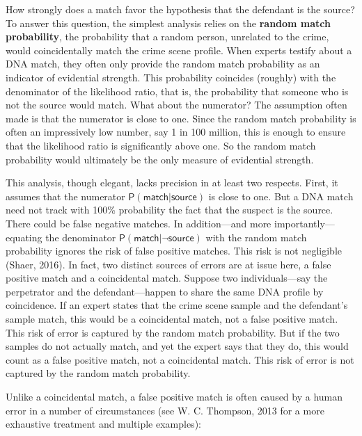 \documentclass[
  10pt,
  dvipsnames,enabledeprecatedfontcommands]{scrartcl}
\newcommand{\raf}[1]{\todo[color=olive!40]{#1}}
\newcommand{\pr}[1]{\mathsf{P}(#1)}
\begin{document}
\noindent How strongly does a match favor the hypothesis that the
defendant is the source? To answer this question, the simplest analysis
relies on the \textbf{random match probability}, the probability that a
random person, unrelated to the crime, would coincidentally match the
crime scene profile. When experts testify about a DNA match, they often
only provide the random match probability as an indicator of evidential
strength. This probability coincides (roughly) with the denominator of
the likelihood ratio, that is, the probability that someone who is not
the source would match. What about the numerator? The assumption often
made is that the numerator is close to one. Since the random match
probability is often an impressively low number, say 1 in 100 million,
this is enough to ensure that the likelihood ratio is significantly
above one. So the random match probability would ultimately be the only
measure of evidential strength.

This analysis, though elegant, lacks precision in at least two respects.
First, it assumes that the numerator
\(\pr{\textsf{match} \vert \textsf{source}}\) is close to one. But a DNA
match need not track with 100\% probability the fact that the suspect is
the source. There could be false negative matches. In addition---and
more importantly---equating the denominator
\(\pr{\textsf{match} \vert \neg \textsf{source}}\) with the random match
probability ignores the risk of false positive matches. This risk is not
negligible (Shaer, 2016). In fact, two distinct sources of errors are at
issue here, a false positive match and a coincidental match. Suppose two
individuals---say the perpetrator and the defendant---happen to share
the same DNA profile by coincidence. If an expert states that the crime
scene sample and the defendant's sample match, this would be a
coincidental match, not a false positive match. This risk of error is
captured by the random match probability. But if the two samples do not
actually match, and yet the expert says that they do, this would count
as a false positive match, not a coincidental match. This risk of error
is not captured by the random match probability.

Unlike a coincidental match, a false positive match is often caused by a
human error in a number of circumstances (see W. C. Thompson, 2013 for a
more exhaustive treatment and multiple examples):

\raf{A: Bib references are missing here, is it on purpose?}
\end{document}
